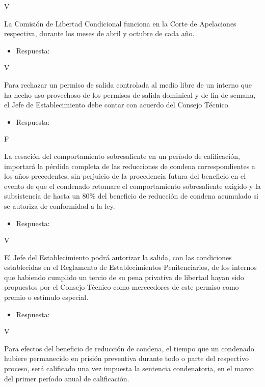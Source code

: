 \documentclass[letterpaper, 11pt]{article}
\begin{document}
V


La Comisión de Libertad Condicional funciona en la Corte de
Apelaciones respectiva, durante los meses de abril y octubre de cada
año.


\begin{itemize}
\item Respuesta:
\end{itemize}

V

Para rechazar un permiso de salida controlada al medio libre de un
interno que ha hecho uso provechoso de los permisos de salida
dominical y de fin de semana, el Jefe de Establecimiento debe contar
con acuerdo del Consejo Técnico.


\begin{itemize}
\item Respuesta:
\end{itemize}

F


La cesación del comportamiento sobresaliente en un período de
calificación, importará la pérdida completa de las reducciones de
condena correspondientes a los años precedentes, sin perjuicio de la
procedencia futura del beneficio en el evento de que el condenado
retomare el comportamiento sobresaliente exigido y la subsistencia de
hasta un 80\% del beneficio de reducción de condena acumulado si se
autoriza de conformidad a la ley.


\begin{itemize}
\item Respuesta:
\end{itemize}

V

El Jefe del Establecimiento podrá autorizar la salida, con las
condiciones establecidas en el Reglamento de Establecimientos
Penitenciarios, de los internos que habiendo cumplido un tercio de su
pena privativa de libertad hayan sido propuestos por el Consejo
Técnico como merecedores de este permiso como premio o estímulo
especial.


\begin{itemize}
\item Respuesta:
\end{itemize}

V

Para efectos del beneficio de reducción de condena, el tiempo que un
condenado hubiere permanecido en prisión preventiva durante todo o
parte del respectivo proceso, será calificado una vez impuesta la
sentencia condenatoria, en el marco del primer período anual de
calificación.
\end{document}
